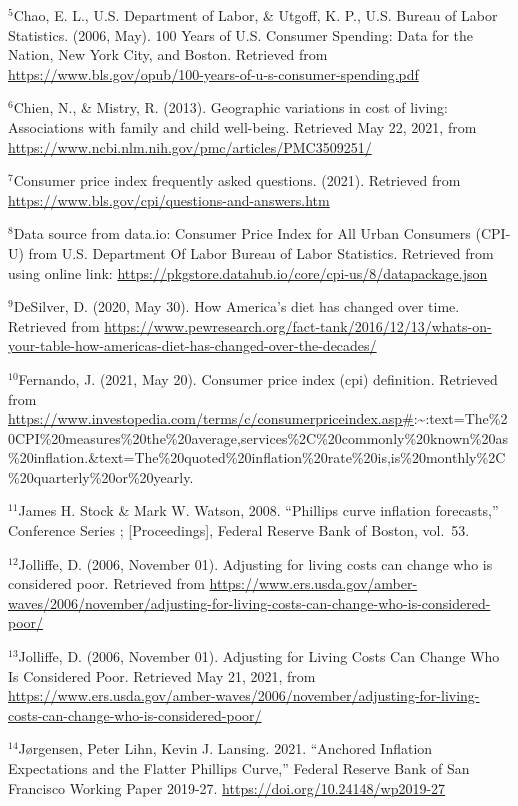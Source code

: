 \documentclass[
]{article}
\begin{document}
\(^{5}\)Chao, E. L., U.S. Department of Labor, \& Utgoff, K. P., U.S.
Bureau of Labor Statistics. (2006, May). 100 Years of U.S. Consumer
Spending: Data for the Nation, New York City, and Boston. Retrieved from
\url{https://www.bls.gov/opub/100-years-of-u-s-consumer-spending.pdf}

\(^{6}\)Chien, N., \& Mistry, R. (2013). Geographic variations in cost
of living: Associations with family and child well-being. Retrieved May
22, 2021, from
\url{https://www.ncbi.nlm.nih.gov/pmc/articles/PMC3509251/}

\(^{7}\)Consumer price index frequently asked questions. (2021).
Retrieved from \url{https://www.bls.gov/cpi/questions-and-answers.htm}

\(^{8}\)Data source from data.io: Consumer Price Index for All Urban
Consumers (CPI-U) from U.S. Department Of Labor Bureau of Labor
Statistics. Retrieved from using online link:
\url{https://pkgstore.datahub.io/core/cpi-us/8/datapackage.json}

\(^{9}\)DeSilver, D. (2020, May 30). How America's diet has changed over
time. Retrieved from
\url{https://www.pewresearch.org/fact-tank/2016/12/13/whats-on-your-table-how-americas-diet-has-changed-over-the-decades/}

\(^{10}\)Fernando, J. (2021, May 20). Consumer price index (cpi)
definition. Retrieved from
\url{https://www.investopedia.com/terms/c/consumerpriceindex.asp\#}:\textasciitilde:text=The\%20CPI\%20measures\%20the\%20average,services\%2C\%20commonly\%20known\%20as\%20inflation.\&text=The\%20quoted\%20inflation\%20rate\%20is,is\%20monthly\%2C\%20quarterly\%20or\%20yearly.

\(^{11}\)James H. Stock \& Mark W. Watson, 2008. ``Phillips curve
inflation forecasts,'' Conference Series ; {[}Proceedings{]}, Federal
Reserve Bank of Boston, vol.~53.

\(^{12}\)Jolliffe, D. (2006, November 01). Adjusting for living costs
can change who is considered poor. Retrieved from
\url{https://www.ers.usda.gov/amber-waves/2006/november/adjusting-for-living-costs-can-change-who-is-considered-poor/}

\(^{13}\)Jolliffe, D. (2006, November 01). Adjusting for Living Costs
Can Change Who Is Considered Poor. Retrieved May 21, 2021, from
\url{https://www.ers.usda.gov/amber-waves/2006/november/adjusting-for-living-costs-can-change-who-is-considered-poor/}

\(^{14}\)Jørgensen, Peter Lihn, Kevin J. Lansing. 2021. ``Anchored
Inflation Expectations and the Flatter Phillips Curve,'' Federal Reserve
Bank of San Francisco Working Paper 2019-27.
\url{https://doi.org/10.24148/wp2019-27}
\end{document}
